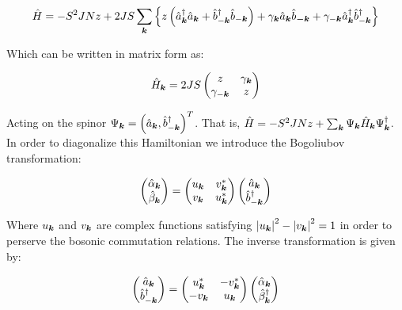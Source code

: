 \begin{equation}
\label{MagnonicH}
\hat{H} = -S^2JNz + 2JS \sum_{\boldsymbol{k}} \left\{ z \left( \hat{a}^\dagger_{\boldsymbol{k}}\hat{a}_{\boldsymbol{k}} + \hat{b}^\dagger_{-\boldsymbol{k}}\hat{b}_{-\boldsymbol{k}} \right) + \gamma_{\boldsymbol{k}}\hat{a}_{\boldsymbol{k}}\hat{b}_{\boldsymbol{-k}} + \gamma_{-\boldsymbol{k}}\hat{a}^\dagger_{\boldsymbol{k}}\hat{b}^\dagger_{-\boldsymbol{k}} \right\}
\end{equation}

Which can be written in matrix form as:

\begin{equation}
\hat{H}_{\boldsymbol{k}} = 2JS\begin{pmatrix} 
z & \gamma_{\boldsymbol{k}} \\
\gamma_{-\boldsymbol{k}} & z
\end{pmatrix}
\end{equation}

Acting on the spinor $\Psi_{\boldsymbol{k}} = \left(\hat{a}_{\boldsymbol{k}},\hat{b}_{-\boldsymbol{k}}^\dagger \right)^T$. That is, $\hat{H} = -S^2JNz + \sum_{\boldsymbol{k}} \Psi_{\boldsymbol{k}} \hat{H}_{\boldsymbol{k}} \Psi^\dagger_{\boldsymbol{k}}$. In order to diagonalize this Hamiltonian we introduce the Bogoliubov transformation:

\begin{equation}
\label{Bogoliubov}
\begin{pmatrix}
\hat{\alpha}_{\boldsymbol{k}} \\
\hat{\beta}_{\boldsymbol{k}}
\end{pmatrix} = 
\begin{pmatrix}
u_{\boldsymbol{k}} & v_{\boldsymbol{k}}^* \\
v_{\boldsymbol{k}} & u_{\boldsymbol{k}}^*
\end{pmatrix}
\begin{pmatrix}
\hat{a}_{\boldsymbol{k}} \\
\hat{b}_{-\boldsymbol{k}}^\dagger
\end{pmatrix}
\end{equation}

Where $u_{\boldsymbol{k}}$ and $v_{\boldsymbol{k}}$ are complex functions satisfying $\abs{u_{\boldsymbol{k}}}^2-\abs{v_{\boldsymbol{k}}}^2 = 1$ in order to perserve the bosonic commutation relations. The inverse transformation is given by:

\begin{equation}
\label{BogoliubovInv}
\begin{pmatrix}
\hat{a}_{\boldsymbol{k}} \\
\hat{b}_{-\boldsymbol{k}}^\dagger
\end{pmatrix} = 
\begin{pmatrix}
u_{\boldsymbol{k}}^* & -v_{\boldsymbol{k}}^* \\
-v_{\boldsymbol{k}} & u_{\boldsymbol{k}}
\end{pmatrix}
\begin{pmatrix}
\hat{\alpha}_{\boldsymbol{k}} \\
\hat{\beta}_{\boldsymbol{k}}^\dagger
\end{pmatrix}
\end{equation}

